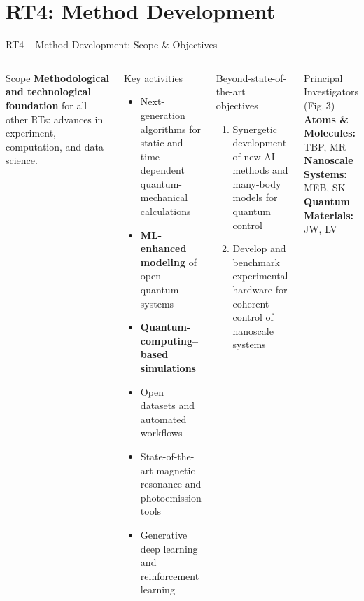 \documentclass[aspectratio=169,10pt]{beamer}
\begin{document}
\section{RT4: Method Development}

\begin{frame}{RT4 -- Method Development: Scope \& Objectives}
  \begin{columns}[T]
      \begin{block}{Scope}
        \textbf{Methodological and technological foundation}
        for all other RTs: advances in experiment, computation,
        and data science.
      \end{block}
      \vspace{2pt}
      \begin{block}{Key activities}
        \begin{itemize}
          \item Next-generation algorithms for static and time-dependent
                quantum-mechanical calculations
          \item \textbf{ML-enhanced modeling} of open quantum systems
          \item \textbf{Quantum-computing--based simulations}
          \item Open datasets and automated workflows
          \item State-of-the-art magnetic resonance and photoemission tools
          \item Generative deep learning and reinforcement learning
        \end{itemize}
      \end{block}
      \begin{alertblock}{Beyond-state-of-the-art objectives}
        \begin{enumerate}
          \item Synergetic development of new AI methods and
                many-body models for quantum control
          \item Develop and benchmark experimental hardware
                for coherent control of nanoscale systems
        \end{enumerate}
      \end{alertblock}
      \vspace{2pt}
      \begin{block}{Principal Investigators (Fig.\,3)}
        \textbf{Atoms \& Molecules:} TBP, MR\\[2pt]
        \textbf{Nanoscale Systems:} MEB, SK\\[2pt]
        \textbf{Quantum Materials:} JW, LV
      \end{block}
  \end{columns}
\end{frame}
\end{document}
